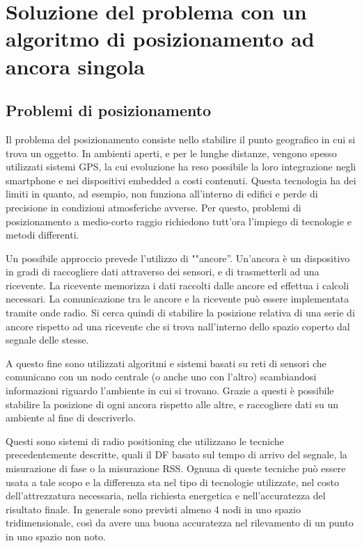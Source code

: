 \chapter{Soluzione del problema con un algoritmo di posizionamento ad ancora singola}
\section{Problemi di posizionamento}
Il problema del posizionamento consiste nello stabilire il punto geografico in cui si trova un oggetto. In ambienti aperti, e per le lunghe distanze, vengono spesso utilizzati sistemi GPS, la cui evoluzione ha reso possibile la loro integrazione negli smartphone e nei dispositivi embedded a costi contenuti. Questa tecnologia ha dei limiti in quanto, ad esempio, non funziona all'interno di edifici e perde di precisione in condizioni atmosferiche avverse. Per questo, problemi di posizionamento a medio-corto raggio richiedono tutt'ora l'impiego di tecnologie  e metodi differenti. 

Un possibile approccio prevede l'utilizzo di ""ancore''. Un'ancora è un dispositivo in gradi di raccogliere dati attraverso dei sensori, e di trasmetterli ad una ricevente. La ricevente memorizza i dati raccolti dalle ancore ed effettua i calcoli necessari. La comunicazione tra le ancore e la ricevente può essere implementata tramite onde radio. Si cerca quindi di stabilire la posizione relativa di una serie di ancore rispetto ad una ricevente che si trova nall'interno dello spazio coperto dal segnale delle stesse.

A questo fine sono utilizzati algoritmi e sistemi basati su reti di sensori che comunicano con un nodo centrale (o anche uno con l'altro) scambiandosi informazioni riguardo l'ambiente in cui si trovano. Grazie a questi è possibile stabilire la posizione di ogni ancora rispetto alle altre, e raccogliere dati su un ambiente al fine di descriverlo. 

Questi sono sistemi di radio positioning che utilizzano le tecniche precedentemente descritte, quali il DF basato sul tempo di arrivo del segnale, la misurazione di fase o la misurazione RSS. Ognuna di queste tecniche può essere usata a tale scopo e la differenza sta nel tipo di tecnologie utilizzate, nel costo dell'attrezzatura necessaria, nella richiesta energetica e nell'accuratezza del risultato finale.
In generale sono previsti almeno 4 nodi in uno spazio tridimensionale, così da avere una buona accuratezza nel rilevamento di un punto in uno spazio non noto. 

